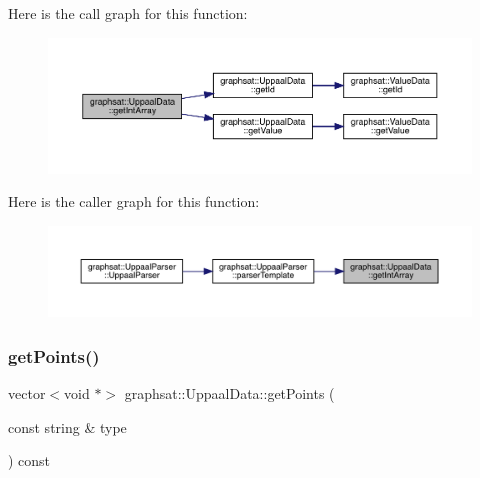 Here is the call graph for this function\+:\nopagebreak
\begin{figure}[H]
\begin{center}
\leavevmode
\includegraphics[width=350pt]{classgraphsat_1_1_uppaal_data_ae7ca546770b68997fac809beec05709f_cgraph}
\end{center}
\end{figure}
Here is the caller graph for this function\+:\nopagebreak
\begin{figure}[H]
\begin{center}
\leavevmode
\includegraphics[width=350pt]{classgraphsat_1_1_uppaal_data_ae7ca546770b68997fac809beec05709f_icgraph}
\end{center}
\end{figure}
\mbox{\label{classgraphsat_1_1_uppaal_data_ad421061c61d3f2012e261c28d44df2be}} 
\subsubsection{\texorpdfstring{getPoints()}{getPoints()}}
{\footnotesize\ttfamily vector$<$void $\ast$$>$ graphsat\+::\+Uppaal\+Data\+::get\+Points (\begin{DoxyParamCaption}\item[{const string \&}]{type }\end{DoxyParamCaption}) const\hspace{0.3cm}{\ttfamily [inline]}}


